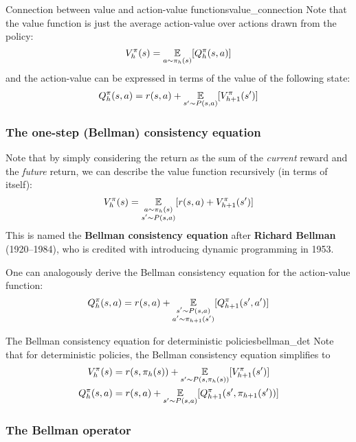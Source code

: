 \documentclass[../main/main]{subfiles}
\begin{document}
\begin{remark}{Connection between value and action-value functions}{value_connection}
    Note that the value function is just the average action-value over actions drawn from the policy:
    \[
        V_h^\pi(s) = \operatorname*{\mathbb{E}}_{a \sim \pi_h(s)} [Q_h^\pi(s, a)]
    \]
    and the action-value can be expressed in terms of the value of the following state:
    \[
        Q_h^\pi(s, a) = r(s, a) + \operatorname*{\mathbb{E}}_{s' \sim P(s, a)} [V_{h+1}^\pi(s')]
    \]
\end{remark}

\subsubsection{The one-step (Bellman) consistency equation}

Note that by simply considering the return as the sum of the \emph{current} reward and the \emph{future} return, we can describe the value function recursively (in terms of itself):
\begin{equation}
    V_h^\pi(s) = \operatorname*{\mathbb{E}}_{\substack{a \sim \pi_h(s) \\ s' \sim P(s, a)}} [r(s, a) + V_{h+1}^\pi(s')] \label{eq:bellman_consistency}
\end{equation}
This is named the \textbf{Bellman consistency equation} after \textbf{Richard Bellman} (1920--1984), who is credited with introducing dynamic programming in 1953.

One can analogously derive the Bellman consistency equation for the action-value function:
\[
    Q_h^\pi(s, a) = r(s, a) + \operatorname*{\mathbb{E}}_{\substack{s' \sim P(s, a) \\ a' \sim \pi_{h+1}(s')}} [Q_{h+1}^\pi(s', a')]
\]

\begin{remark}{The Bellman consistency equation for deterministic policies}{bellman_det}
    Note that for deterministic policies, the Bellman consistency equation simplifies to
    \begin{align*}
        V_h^\pi(s) &= r(s, \pi_h(s)) + \operatorname*{\mathbb{E}}_{s' \sim P(s, \pi_h(s))} [V_{h+1}^\pi(s')] \\
        Q_h^\pi(s, a) &= r(s, a) + \operatorname*{\mathbb{E}}_{s' \sim P(s, a)} [Q_{h+1}^\pi(s', \pi_{h+1}(s'))]
    \end{align*}
\end{remark}

\subsubsection{The Bellman operator}
\label{sec:bellman_operator}
\end{document}
